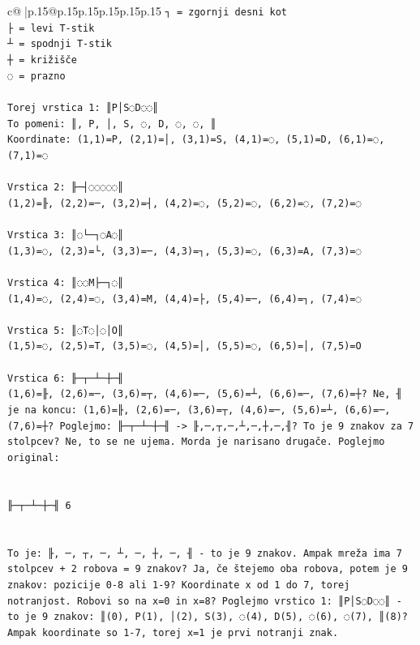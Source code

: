 \documentclass{article}
\begin{document}
{\begin{supertabular}{c@{$\;$}|p{.15\linewidth}@{}p{.15\linewidth}p{.15\linewidth}p{.15\linewidth}p{.15\linewidth}p{.15\linewidth}}
{{{\texttt{┐ = zgornji desni kot} \\
\texttt{├ = levi T{-}stik} \\
\texttt{┴ = spodnji T{-}stik} \\
\texttt{┼ = križišče} \\
\texttt{◌ = prazno} \\
\\ 
\texttt{Torej vrstica 1: ║P│S◌D◌◌║} \\
\texttt{To pomeni: ║, P, │, S, ◌, D, ◌, ◌, ║} \\
\texttt{Koordinate: (1,1)=P, (2,1)=│, (3,1)=S, (4,1)=◌, (5,1)=D, (6,1)=◌, (7,1)=◌} \\
\\ 
\texttt{Vrstica 2: ╟─┤◌◌◌◌◌║} \\
\texttt{(1,2)=╟, (2,2)=─, (3,2)=┤, (4,2)=◌, (5,2)=◌, (6,2)=◌, (7,2)=◌} \\
\\ 
\texttt{Vrstica 3: ║◌└─┐◌A◌║} \\
\texttt{(1,3)=◌, (2,3)=└, (3,3)=─, (4,3)=┐, (5,3)=◌, (6,3)=A, (7,3)=◌} \\
\\ 
\texttt{Vrstica 4: ║◌◌M├─┐◌║} \\
\texttt{(1,4)=◌, (2,4)=◌, (3,4)=M, (4,4)=├, (5,4)=─, (6,4)=┐, (7,4)=◌} \\
\\ 
\texttt{Vrstica 5: ║◌T◌│◌│O║} \\
\texttt{(1,5)=◌, (2,5)=T, (3,5)=◌, (4,5)=│, (5,5)=◌, (6,5)=│, (7,5)=O} \\
\\ 
\texttt{Vrstica 6: ╟─┬─┴─┼─╢} \\
\texttt{(1,6)=╟, (2,6)=─, (3,6)=┬, (4,6)=─, (5,6)=┴, (6,6)=─, (7,6)=┼? Ne, ╢ je na koncu: (1,6)=╟, (2,6)=─, (3,6)=┬, (4,6)=─, (5,6)=┴, (6,6)=─, (7,6)=┼? Poglejmo: ╟─┬─┴─┼─╢ {-}> ╟,─,┬,─,┴,─,┼,─,╢? To je 9 znakov za 7 stolpcev? Ne, to se ne ujema. Morda je narisano drugače. Poglejmo original:} \\
\\ 
\\ 
\texttt{╟─┬─┴─┼─╢ 6} \\
\\ 
\\ 
\texttt{To je: ╟, ─, ┬, ─, ┴, ─, ┼, ─, ╢ {-} to je 9 znakov. Ampak mreža ima 7 stolpcev + 2 robova = 9 znakov? Ja, če štejemo oba robova, potem je 9 znakov: pozicije 0{-}8 ali 1{-}9? Koordinate x od 1 do 7, torej notranjost. Robovi so na x=0 in x=8? Poglejmo vrstico 1: ║P│S◌D◌◌║ {-} to je 9 znakov: ║(0), P(1), │(2), S(3), ◌(4), D(5), ◌(6), ◌(7), ║(8)? Ampak koordinate so 1{-}7, torej x=1 je prvi notranji znak.} \\
}}}
\end{supertabular}}
\end{document}
